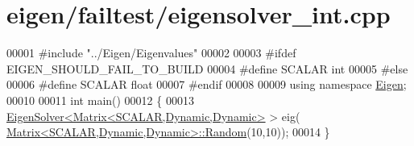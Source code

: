 \hypertarget{eigen_2failtest_2eigensolver__int_8cpp_source}{}\section{eigen/failtest/eigensolver\+\_\+int.cpp}
\label{eigen_2failtest_2eigensolver__int_8cpp_source}

\begin{DoxyCode}
00001 \textcolor{preprocessor}{#include "../Eigen/Eigenvalues"}
00002 
00003 \textcolor{preprocessor}{#ifdef EIGEN\_SHOULD\_FAIL\_TO\_BUILD}
00004 \textcolor{preprocessor}{#define SCALAR int}
00005 \textcolor{preprocessor}{#else}
00006 \textcolor{preprocessor}{#define SCALAR float}
00007 \textcolor{preprocessor}{#endif}
00008 
00009 \textcolor{keyword}{using namespace }\hyperlink{namespace_eigen}{Eigen};
00010 
00011 \textcolor{keywordtype}{int} main()
00012 \{
00013   \hyperlink{group___eigenvalues___module_class_eigen_1_1_eigen_solver}{EigenSolver<Matrix<SCALAR,Dynamic,Dynamic>} > eig(
      \hyperlink{group___core___module_class_eigen_1_1_matrix}{Matrix<SCALAR,Dynamic,Dynamic>::Random}(10,10));
00014 \}
\end{DoxyCode}

